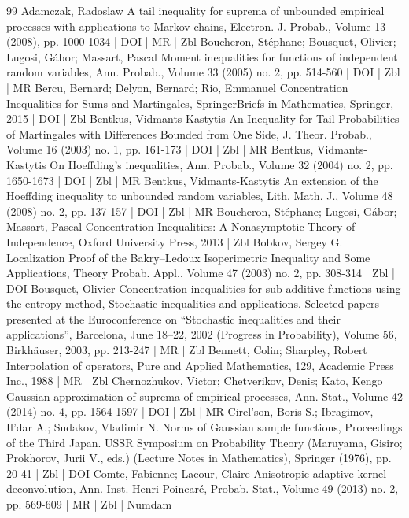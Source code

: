 \begin{thebibliography}{99}
Adamczak, Radoslaw A tail inequality for suprema of unbounded empirical processes with applications to Markov chains, Electron. J. Probab., Volume 13 (2008), pp. 1000-1034 | DOI | MR | Zbl
Boucheron, Stéphane; Bousquet, Olivier; Lugosi, Gábor; Massart, Pascal Moment inequalities for functions of independent random variables, Ann. Probab., Volume 33 (2005) no. 2, pp. 514-560 | DOI | Zbl | MR
Bercu, Bernard; Delyon, Bernard; Rio, Emmanuel Concentration Inequalities for Sums and Martingales, SpringerBriefs in Mathematics, Springer, 2015 | DOI | Zbl
Bentkus, Vidmants-Kastytis An Inequality for Tail Probabilities of Martingales with Differences Bounded from One Side, J. Theor. Probab., Volume 16 (2003) no. 1, pp. 161-173 | DOI | Zbl | MR
Bentkus, Vidmants-Kastytis On Hoeffding’s inequalities, Ann. Probab., Volume 32 (2004) no. 2, pp. 1650-1673 | DOI | Zbl | MR
Bentkus, Vidmants-Kastytis An extension of the Hoeffding inequality to unbounded random variables, Lith. Math. J., Volume 48 (2008) no. 2, pp. 137-157 | DOI | Zbl | MR
Boucheron, Stéphane; Lugosi, Gábor; Massart, Pascal Concentration Inequalities: A Nonasymptotic Theory of Independence, Oxford University Press, 2013 | Zbl
Bobkov, Sergey G. Localization Proof of the Bakry–Ledoux Isoperimetric Inequality and Some Applications, Theory Probab. Appl., Volume 47 (2003) no. 2, pp. 308-314 | Zbl | DOI
Bousquet, Olivier Concentration inequalities for sub-additive functions using the entropy method, Stochastic inequalities and applications. Selected papers presented at the Euroconference on “Stochastic inequalities and their applications”, Barcelona, June 18–22, 2002 (Progress in Probability), Volume 56, Birkhäuser, 2003, pp. 213-247 | MR | Zbl
Bennett, Colin; Sharpley, Robert Interpolation of operators, Pure and Applied Mathematics, 129, Academic Press Inc., 1988 | MR | Zbl
Chernozhukov, Victor; Chetverikov, Denis; Kato, Kengo Gaussian approximation of suprema of empirical processes, Ann. Stat., Volume 42 (2014) no. 4, pp. 1564-1597 | DOI | Zbl | MR
Cirel’son, Boris S.; Ibragimov, Il’dar A.; Sudakov, Vladimir N. Norms of Gaussian sample functions, Proceedings of the Third Japan. USSR Symposium on Probability Theory (Maruyama, Gisiro; Prokhorov, Jurii V., eds.) (Lecture Notes in Mathematics), Springer (1976), pp. 20-41 | Zbl | DOI
Comte, Fabienne; Lacour, Claire Anisotropic adaptive kernel deconvolution, Ann. Inst. Henri Poincaré, Probab. Stat., Volume 49 (2013) no. 2, pp. 569-609 | MR | Zbl | Numdam

\end{thebibliography}
